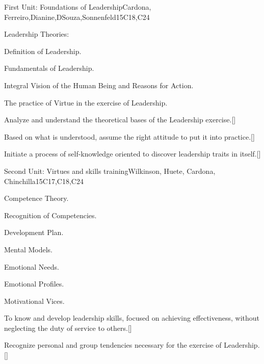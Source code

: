 \begin{syllabus}
\begin{unit}{}{First Unit: Foundations of Leadership}{Cardona, Ferreiro,Dianine,DSouza,Sonnenfeld}{15}{C18,C24}
\begin{topics}
	\item Leadership Theories: 
	\item Definition of Leadership.
	\item Fundamentals of Leadership.
	\item Integral Vision of the Human Being and Reasons for Action.
	\item The practice of Virtue in the exercise of Leadership.
\end{topics}
\begin{learningoutcomes}
	\item Analyze and understand the theoretical bases of the Leadership exercise.[\Familiarity]
	\item Based on what is understood, assume the right attitude to put it into practice.[\Familiarity]
	\item Initiate a process of self-knowledge oriented to discover leadership traits in itself.[\Familiarity]
\end{learningoutcomes}
\end{unit}

\begin{unit}{}{Second Unit: Virtues and skills training}{Wilkinson, Huete, Cardona, Chinchilla}{15}{C17,C18,C24}
\begin{topics}
	
	\item Competence Theory.
	\item Recognition of Competencies.
	\item Development Plan.
	\item Mental Models.
	\item Emotional Needs.
	\item Emotional Profiles.
	\item Motivational Vices.

\end{topics}
\begin{learningoutcomes}
	\item To know and develop leadership skills, focused on achieving effectiveness, without neglecting the duty of service to others.[\Familiarity]
	\item Recognize personal and group tendencies necessary for the exercise of Leadership.[\Familiarity]
\end{learningoutcomes}
\end{unit}


\end{syllabus}
